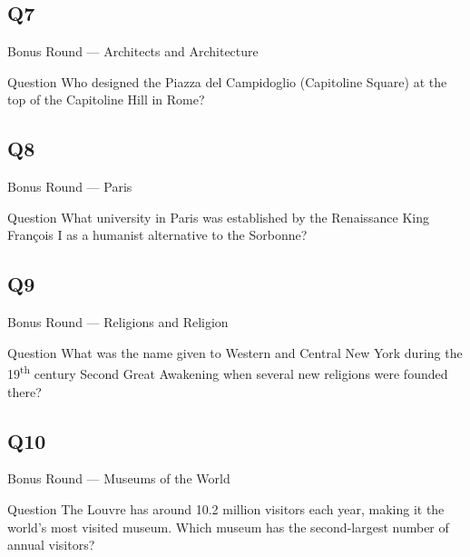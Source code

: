 \documentclass[11pt]{beamer}
\begin{document}
\subsection*{Q7}
\begin{frame}[t]{Bonus Round --- Architects and Architecture}
\vspace{-0.5em}
\begin{block}{Question}
Who designed the Piazza del Campidoglio (Capitoline Square) at the top of the Capitoline Hill in Rome?
\end{block}
\end{frame}
\subsection*{Q8}
\begin{frame}[t]{Bonus Round --- Paris}
\vspace{-0.5em}
\begin{block}{Question}
What university in Paris was established by the  Renaissance King  Fran\c{c}ois I as a humanist alternative to the Sorbonne?
\end{block}
\end{frame}
\subsection*{Q9}
\begin{frame}[t]{Bonus Round --- Religions and Religion}
\vspace{-0.5em}
\begin{block}{Question}
What was the name given to Western and Central New York during the 19\textsuperscript{th} century Second Great Awakening when several new religions were founded there?
\end{block}
\end{frame}
\subsection*{Q10}
\begin{frame}[t]{Bonus Round --- Museums of the World}
\vspace{-0.5em}
\begin{block}{Question}
The Louvre has around 10.2 million visitors each year, making it the world's most visited museum. Which museum has the second-largest number of annual visitors?
\end{block}
\end{frame}
\end{document}
